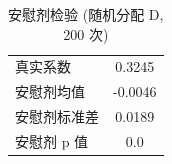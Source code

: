 \begin{table}[htbp]
\centering
\caption{安慰剂检验 (随机分配 D, 200 次)}
\label{tab:placebo}
\begin{tabular}{lc}
\toprule
真实系数 & 0.3245 \\
安慰剂均值 & -0.0046 \\
安慰剂标准差 & 0.0189 \\
安慰剂 p 值 & 0.0 \\
\bottomrule
\end{tabular}
\end{table}
